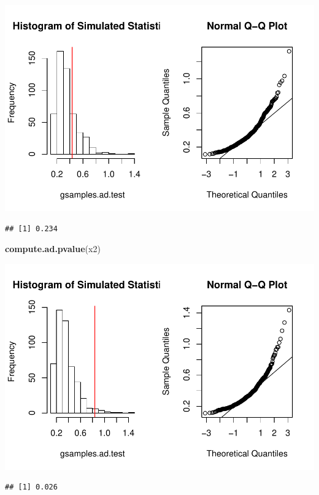 \documentclass[]{article}
\newenvironment{Shaded}{\begin{snugshade}}{\end{snugshade}}
\newcommand{\KeywordTok}[1]{\textcolor[rgb]{0.13,0.29,0.53}{\textbf{#1}}}
\newcommand{\NormalTok}[1]{#1}
\begin{document}
\includegraphics{Assessed1S1_files/figure-latex/unnamed-chunk-3-1.pdf}

\begin{verbatim}
## [1] 0.234
\end{verbatim}

\begin{Shaded}
\begin{Highlighting}[]
\KeywordTok{compute.ad.pvalue}\NormalTok{(x2)}
\end{Highlighting}
\end{Shaded}

\includegraphics{Assessed1S1_files/figure-latex/unnamed-chunk-3-2.pdf}

\begin{verbatim}
## [1] 0.026
\end{verbatim}
\end{document}
